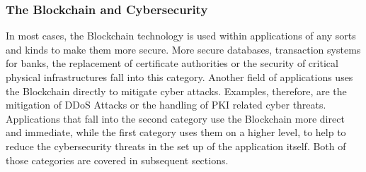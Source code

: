 \subsubsection{The Blockchain and Cybersecurity}
In most cases, the Blockchain technology is used within applications of any sorts and kinds to make them more secure. More secure databases, transaction systems for banks, the replacement of certificate authorities or the security of critical physical infrastructures fall into this category. Another field of applications uses the Blockchain directly to mitigate cyber attacks. Examples, therefore, are the mitigation of DDoS Attacks or the handling of PKI related cyber threats. Applications that fall into the second category use the Blockchain more direct and immediate, while the first category uses them on a higher level, to help to reduce the cybersecurity threats in the set up of the application itself. Both of those categories are covered in subsequent sections.
